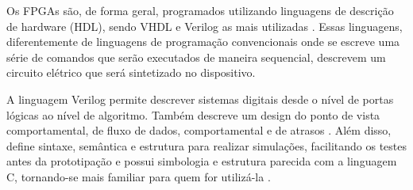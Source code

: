 Os FPGAs são, de forma geral, programados utilizando linguagens de descrição de hardware (HDL), sendo VHDL e Verilog as mais utilizadas \cite{Ain}. Essas linguagens, diferentemente de linguagens de programação convencionais onde se escreve uma série de comandos que serão executados de maneira sequencial, descrevem um circuito elétrico que será sintetizado no dispositivo.

A linguagem Verilog permite descrever sistemas digitais desde o nível de portas lógicas ao nível de algoritmo. Também descreve um design do ponto de vista comportamental, de fluxo de dados, comportamental e de atrasos \cite{Bhasker}. Além disso, define sintaxe, semântica e estrutura para realizar simulações, facilitando os testes antes da prototipação e possui simbologia e estrutura parecida com a linguagem C, tornando-se mais familiar para quem for utilizá-la \cite{Wunnava}.
